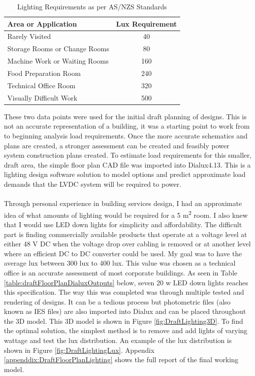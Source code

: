 \begin{table}[H]
\centering
\renewcommand{\arraystretch}{2}
\begin{tabular}{|l|c|}
\hline
\textbf{Area or Application} & \multicolumn{1}{l|}{\textbf{Lux Requirement}} \\ \hline
Rarely Visited & 40 \\ \hline
Storage Rooms or Change Rooms & 80 \\ \hline
Machine Work or Waiting Rooms & 160 \\ \hline
Food Preparation Room & 240 \\ \hline
Technical Office Room & 320 \\ \hline
Visually Difficult Work & 500 \\ \hline
\end{tabular}
\caption{Lighting Requirements as per AS/NZS Standards \cite{StandardsAustralia2006_2}}
\label{table:LightingRequirements}
\end{table}

These two data points were used for the initial draft planning of designs. This is not an accurate representation of a building, it was a starting point to work from to beginning analysis load requirements. Once the more accurate schematics and plans are created, a stronger assessment can be created and feasibly power system construction plans created. To estimate load requirements for this smaller, draft area, the simple floor plan CAD file was imported into Dialux4.13. This is a lighting design software solution to model options and predict approximate load demands that the LVDC system will be required to power.  

\paragraph{}
Through personal experience in building services design, I had an approximate idea of what amounts of lighting would be required for a 5 \si{m^2} room. I also knew that I would use LED down lights for simplicity and affordability. The difficult part is finding commercially available products that operate at a voltage level at either 48 V DC when the voltage drop over cabling is removed or at another level where an efficient DC to DC converter could be used. My goal was to have the average lux between 300 \si{lux} to 400 \si{lux}. This value was chosen as a technical office is an accurate assessment of most corporate buildings. As seen in Table \ref{table:draftFloorPlanDialuxOutputs} below, seven 20 \si{w} LED down lights reaches this specification. The way this was completed was through multiple tested and rendering of designs. It can be a tedious process but photometric files (also known as IES files) are also imported into Dialux and can be placed throughout the 3D model. This 3D model is shown in Figure \ref{fig:DraftLighting3D}. To find the optimal solution, the simplest method is to remove and add lights of varying wattage and test the lux distribution. An example of the lux distribution is shown in Figure \ref{fig:DraftLightingLux}. Appendix \ref{appenddix:DraftFloorPlanLighting} shows the full report of the final working model.   

